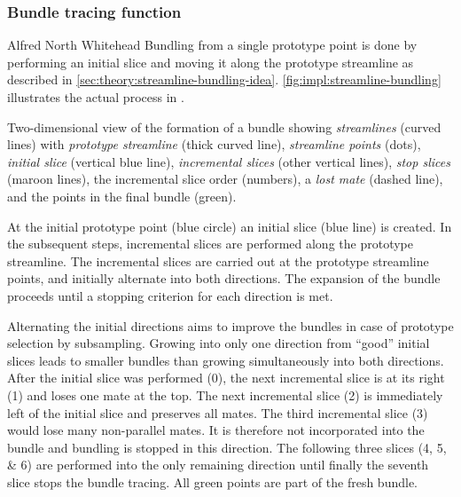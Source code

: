 \subsubsection{Bundle tracing function}

{Alfred North Whitehead}%
%
Bundling from a single prototype point is done by performing an initial slice and moving it along the prototype streamline as described in \autoref{sec:theory:streamline-bundling-idea}. \autoref{fig:impl:streamline-bundling} illustrates the actual process in \twod. 

{Two-dimensional view of the formation of a bundle showing \emph{streamlines} (curved lines) with \emph{prototype streamline} (thick curved line), \emph{streamline points} (dots), \emph{initial slice} (vertical blue line), \emph{incremental slices} (other vertical lines), \emph{stop slices} (maroon lines), the incremental slice order (numbers), a \emph{lost mate} (dashed line), and the points in the final bundle (green).}

At the initial prototype point (blue circle) an initial slice (blue line) is created. In the subsequent steps, incremental slices are performed along the prototype streamline. The incremental slices are carried out at the prototype streamline points, and initially alternate into both directions. The expansion of the bundle proceeds until a stopping criterion for each direction is met.

Alternating the initial directions aims to improve the bundles in case of prototype selection by subsampling. Growing into only one direction from ``good'' initial slices leads to smaller bundles than growing simultaneously into both directions.
After the initial slice was performed (\num{0}), the next incremental slice is at its right (\num{1}) and loses one mate at the top. The next incremental slice (\num{2}) is immediately left of the initial slice and preserves all mates. The third incremental slice (\num{3}) would lose many non-parallel mates. It is therefore not incorporated into the bundle and bundling is stopped in this direction. The following three slices (\numlist{4;5;6}) are performed into the only remaining direction until finally the seventh slice stops the bundle tracing. All green points are part of the fresh bundle.
%

